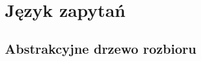 \documentclass[thesis.tex]{subfiles}
\begin{document}
\chapter{Język zapytań}

\section{Abstrakcyjne drzewo rozbioru}
\end{document}
